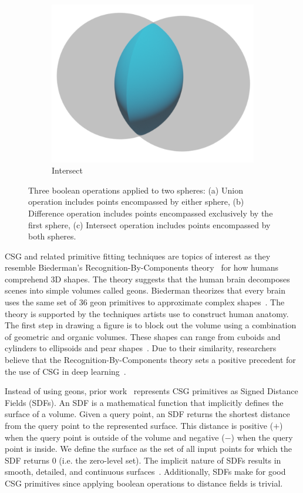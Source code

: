 \begin{figure}
\begin{subfigure}[t]{0.3\textwidth}
		\includegraphics[width=\textwidth]{Images/Intersect}
		\caption{Intersect}
	\end{subfigure}
	\caption{Three boolean operations applied to two spheres: (a) Union operation includes points encompassed by either sphere, (b) Difference operation includes points encompassed exclusively by the first sphere, (c) Intersect operation includes points encompassed by both spheres.}
	\label{fig:boolean operations}
\end{figure}

CSG and related primitive fitting techniques are topics of interest as they resemble Biederman's Recognition-By-Components theory~\cite{Biederman1987} for how humans comprehend 3D shapes. The theory suggests that the human brain decomposes scenes into simple volumes called geons. Biederman theorizes that every brain uses the same set of 36 geon primitives to approximate complex shapes~\cite{Biederman1987}. The theory is supported by the techniques artists use to construct human anatomy. The first step in drawing a figure is to block out the volume using a combination of geometric and organic volumes. These shapes can range from cuboids and cylinders to ellipsoids and pear shapes~\cite{Winslow2015}. Due to their similarity, researchers believe that the Recognition-By-Components theory sets a positive precedent for the use of CSG in deep learning~\cite{Sharma2018}.

Instead of using geons, prior work~\cite{Sharma2018, Kania2020, Ren2021} represents CSG primitives as Signed Distance Fields (SDFs). An SDF is a mathematical function that implicitly defines the surface of a volume. Given a query point, an SDF returns the shortest distance from the query point to the represented surface. This distance is positive ($+$) when the query point is outside of the volume and negative ($-$) when the query point is inside. We define the surface as the set of all input points for which the SDF returns 0 (i.e. the zero-level set). The implicit nature of SDFs results in smooth, detailed, and continuous surfaces~\cite{Park2019}. Additionally, SDFs make for good CSG primitives since applying boolean operations to distance fields is trivial.

